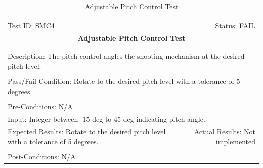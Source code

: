 \documentclass[11pt]{article}
\begin{document}
\begin{center}
\begin{table}[H]
\begin{tabular}{|l r|}\hline&\\[-2mm]
	Test ID: SMC4	&Status: FAIL\\[-3mm]
	\multicolumn{2}{|c|}{\textbf{\large{Adjustable Pitch Control Test}}}\\&\\\hline&\\[-3mm]
	\multicolumn{2}{|p{\textwidth}|}{Description: The pitch control angles the shooting mechanism at the desired pitch level.}\\[1mm]\hline&\\[-3mm]
	\multicolumn{2}{|p{\textwidth}|}{Pass/Fail Condition: Rotate to the desired pitch level with a tolerance of 5 degrees.}\\[1mm]\hline&\\[-3mm]
	\multicolumn{2}{|p{\textwidth}|}{Pre-Conditions: N/A}\\[4mm]
	\multicolumn{2}{|p{\textwidth}|}{Input: Integer between -15 deg to 45 deg indicating pitch angle.}\\[2mm]\hline
	\multicolumn{1}{|p{0.49\textwidth}}{Expected Results: Rotate to the desired pitch level with a tolerance of 5 degrees.
}	&\multicolumn{1}{|p{0.45\textwidth}|}{Actual Results: Not implemented}\\\hline&\\[-3mm]
	\multicolumn{2}{|p{\textwidth}|}{Post-Conditions: N/A}\\\hline
\end{tabular}
\caption{Adjustable Pitch Control Test}
\end{table}
\end{center}
\end{document}
